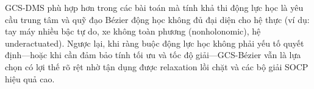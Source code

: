 GCS-DMS phù hợp hơn trong các bài toán mà tính khả thi động lực học là yêu cầu trung tâm và quỹ đạo Bézier động học không đủ đại diện cho hệ thực (ví dụ: tay máy nhiều bậc tự do, xe không toàn phương (nonholonomic), hệ underactuated). Ngược lại, khi ràng buộc động lực học không phải yếu tố quyết định---hoặc khi cần đảm bảo tính tối ưu và tốc độ giải---GCS-Bézier vẫn là lựa chọn có lợi thế rõ rệt nhờ tận dụng được relaxation lồi chặt và các bộ giải SOCP hiệu quả cao.
